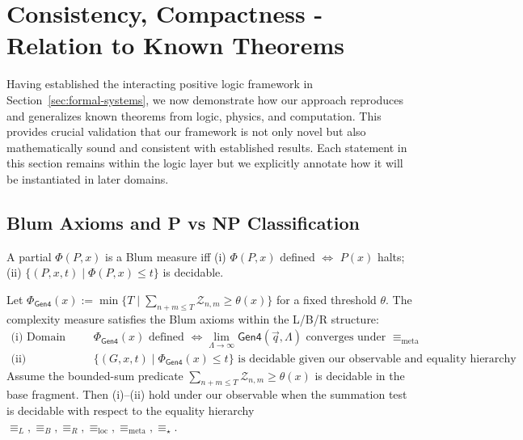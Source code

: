 \section{Consistency, Compactness - Relation to Known Theorems}
\label{sec:consistency}

Having established the interacting positive logic framework in Section~\ref{sec:formal-systems}, we now demonstrate how our approach reproduces and generalizes known theorems from logic, physics, and computation. This provides crucial validation that our framework is not only novel but also mathematically sound and consistent with established results. Each statement in this section remains within the logic layer but we explicitly annotate how it will be instantiated in later domains.

\subsection{Blum Axioms and P vs NP Classification}

\begin{definition}
A partial $\Phi(P,x)$ is a Blum measure iff
(i) $\Phi(P,x)$ defined $\Leftrightarrow$ $P(x)$ halts;
(ii) $\{(P,x,t)\mid \Phi(P,x)\le t\}$ is decidable.
\end{definition}

\begin{proposition}
Let $\Phi_{\mathsf{Gen4}}(x):=\min\{T\mid \sum_{n+m\le T}\mathcal{Z}_{n,m}\ge \theta(x)\}$ for a fixed threshold $\theta$.
The complexity measure satisfies the Blum axioms within the L/B/R structure:
\begin{align}
\text{(i) Domain condition: } &\Phi_{\mathsf{Gen4}}(x) \text{ defined } \Leftrightarrow \lim_{\Lambda \to \infty} \mathsf{Gen4}(\vec{q}, \Lambda) \text{ converges under } \equiv_{\text{meta}} \\
\text{(ii) Decidability: } &\{(G,x,t) \mid \Phi_{\mathsf{Gen4}}(x) \leq t\} \text{ is decidable given our observable and equality hierarchy}
\end{align}
Assume the bounded-sum predicate $\sum_{n+m\le T}\mathcal{Z}_{n,m}\ge\theta(x)$ is decidable in the base fragment. Then (i)–(ii) hold under our observable when the summation test is decidable with respect to the equality hierarchy $\equiv_L, \equiv_B, \equiv_R, \equiv_{\text{loc}}, \equiv_{\text{meta}}, \equiv_\star$.
\end{proposition}

